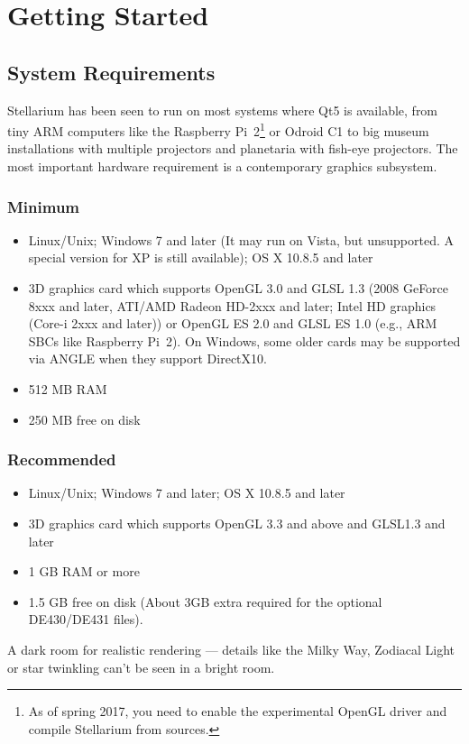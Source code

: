 

\chapter{Getting Started}
\label{ch:GettingStarted}

\section{System Requirements}
\label{sec:GettingStarted:SystemRequirements}

Stellarium has been seen to run on most systems where Qt5 is
available, from tiny ARM computers like the Raspberry Pi~2\footnote{As
  of spring 2017, you need to enable the experimental OpenGL driver
  and compile Stellarium from sources.} or Odroid C1 to big museum
installations with multiple projectors and planetaria with fish-eye 
projectors. 
The most important hardware requirement is a contemporary graphics subsystem.


\subsection{Minimum}
\begin{itemize}
\item Linux/Unix; Windows 7 and later (It may run on Vista, but unsupported. A special version for XP is still available); OS X 10.8.5 and later
\item 3D graphics card which supports OpenGL 3.0 and GLSL 1.3 (2008
  GeForce 8xxx and later, ATI/AMD Radeon HD-2xxx and later; Intel HD
  graphics (Core-i 2xxx and later)) or OpenGL ES 2.0 and GLSL ES 1.0
  (e.g., ARM SBCs like Raspberry Pi~2). On Windows, some older cards
  may be supported via ANGLE when they support DirectX10.
\item 512 MB RAM
\item 250 MB free on disk
\end{itemize}

\subsection{Recommended}
\begin{itemize}
\item Linux/Unix; Windows 7 and later; OS X 10.8.5 and later
\item 3D graphics card which supports OpenGL 3.3 and above and GLSL1.3 and later
\item 1 GB RAM or more
\item 1.5 GB free on disk (About 3GB extra required for the optional DE430/DE431 files).
\end{itemize}
 A dark room for realistic rendering --- details like the Milky Way, Zodiacal Light or
star twinkling can't be seen in a bright room.


